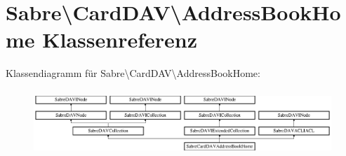 \hypertarget{class_sabre_1_1_card_d_a_v_1_1_address_book_home}{}\section{Sabre\textbackslash{}Card\+D\+AV\textbackslash{}Address\+Book\+Home Klassenreferenz}
\label{class_sabre_1_1_card_d_a_v_1_1_address_book_home}
Klassendiagramm für Sabre\textbackslash{}Card\+D\+AV\textbackslash{}Address\+Book\+Home\+:\begin{figure}[H]
\begin{center}
\leavevmode
\includegraphics[height=2.500000cm]{class_sabre_1_1_card_d_a_v_1_1_address_book_home}
\end{center}
\end{figure}
